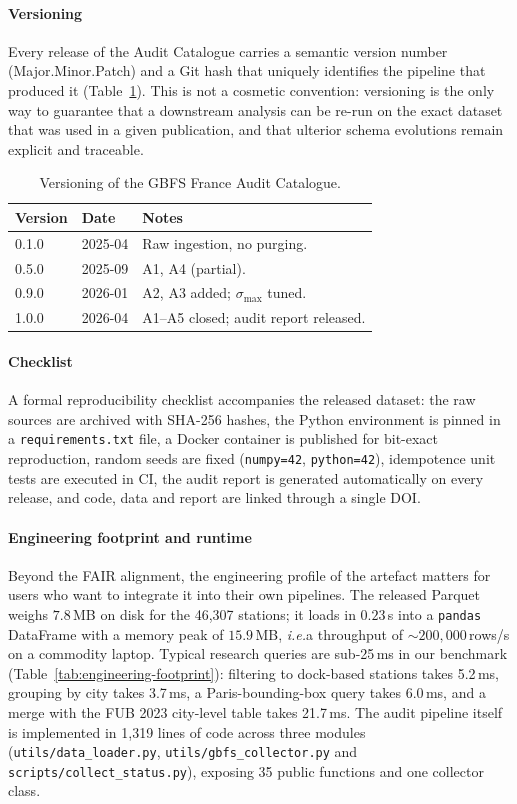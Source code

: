 \documentclass[a4paper,twoside]{article}
\newcommand{\ie}{\emph{i.e.}}
\begin{document}
\paragraph{Versioning}
Every release of the Audit Catalogue carries a semantic version
number (Major.Minor.Patch) and a Git hash that uniquely
identifies the pipeline that produced it
(Table~\ref{tab:versions}). This is not a cosmetic convention:
versioning is the only way to guarantee that a downstream
analysis can be re-run on the exact dataset that was used in a
given publication, and that ulterior schema evolutions remain
explicit and traceable.

\begin{table}[ht]
\centering
\caption{Versioning of the GBFS France Audit Catalogue.}
\label{tab:versions}
\small
\begin{tabular}{@{}lll@{}}
\toprule
\textbf{Version} & \textbf{Date} & \textbf{Notes}\\
\midrule
0.1.0 & 2025-04 & Raw ingestion, no purging.\\
0.5.0 & 2025-09 & A1, A4 (partial).\\
0.9.0 & 2026-01 & A2, A3 added; $\sigma_{\max}$ tuned.\\
1.0.0 & 2026-04 & A1--A5 closed; audit report released.\\
\bottomrule
\end{tabular}
\end{table}

\paragraph{Checklist}
A formal reproducibility checklist accompanies the released
dataset: the raw sources are archived with SHA-256 hashes, the
Python environment is pinned in a \texttt{requirements.txt} file,
a Docker container is published for bit-exact reproduction,
random seeds are fixed (\texttt{numpy=42},
\texttt{python=42}), idempotence unit tests are executed in CI,
the audit report is generated automatically on every release,
and code, data and report are linked through a single DOI.

\paragraph{Engineering footprint and runtime}
Beyond the FAIR alignment, the engineering profile of the
artefact matters for users who want to integrate it into their
own pipelines. The released Parquet weighs $7.8$\,MB on disk for
the 46{,}307 stations; it loads in $0.23$\,s into a
\texttt{pandas} DataFrame with a memory peak of $15.9$\,MB,
\ie a throughput of $\sim 200{,}000$\,rows/s on a commodity
laptop. Typical research queries are sub-25\,ms in our benchmark
(Table~\ref{tab:engineering-footprint}): filtering to dock-based
stations takes 5.2\,ms, grouping by city takes 3.7\,ms, a
Paris-bounding-box query takes 6.0\,ms, and a merge with the FUB
2023 city-level table takes 21.7\,ms. The audit pipeline itself
is implemented in 1{,}319 lines of code across three modules
(\texttt{utils/data\_loader.py}, \texttt{utils/gbfs\_collector.py}
and \texttt{scripts/collect\_status.py}), exposing 35 public
functions and one collector class.
\end{document}

